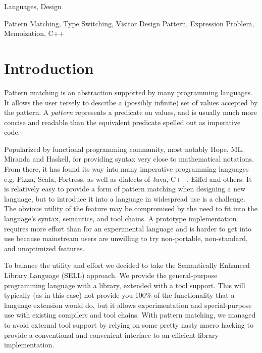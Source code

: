 \documentclass[preprint]{sigplanconf}
\begin{document}

\terms
Languages, Design

\keywords
Pattern Matching, Type Switching, Visitor Design Pattern, Expression Problem, Memoization, C++

\section{Introduction} %
\label{sec:intro}


Pattern matching is an abstraction supported by many programming languages.
It allows the user tersely to describe a (possibly infinite) set of 
values accepted by the pattern. A \emph{pattern} represents a predicate on 
values, and is usually  much more concise and readable than the 
equivalent predicate spelled out as imperative code.

Popularized by functional programming community, most notably Hope\cite{BMS80}, 
ML\cite{ML90}, Miranda\cite{Miranda85} and Haskell\cite{Haskell98Book}, for 
providing syntax very close to mathematical notations.
From there, it has 
found its way into many imperative programming languages e.g. 
Pizza\cite{Odersky97pizzainto}, Scala\cite{Scala2nd}, Fortress\cite{RPS10}, as 
well as dialects of Java\cite{Liu03jmatch:iterable,HydroJ2003}, C++\cite{Prop96}, 
Eiffel\cite{Moreau:2003} and others. It is relatively easy to provide a form of pattern 
matching when designing a new language, but to introduce it into a language in 
widespread use is a challenge. The obvious utility of the feature may be 
compromised by the need to fit into the language's syntax, semantics, and tool 
chains. A prototype implementation requires more effort than for an experimental 
language and is harder to get into use because mainstream users are unwilling 
to try non-portable, non-standard, and unoptimized features.

To balance the utility and effort we decided to take the Semantically 
Enhanced Library Language (SELL) approach\cite{SELL}. We provide the
general-purpose programming language with a library, extended with a tool 
support. This will typically (as in this case) not provide you 100\% of the functionality that a 
language extension would do, but it allows experimentation and special-purpose use
with existing compilers and tool chains. With pattern matching, we managed to avoid 
external tool support by relying on some pretty nasty macro hacking to provide a
conventional and convenient interface to an efficient library implementation.
\end{document}
